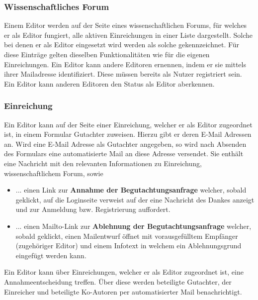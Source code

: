 \subsubsection{Wissenschaftliches Forum}
\begin{description}
     Einem Editor werden auf der Seite eines wissenschaftlichen Forums, für
    welches er als Editor fungiert, alle aktiven Einreichungen in einer Liste dargestellt.
    Solche bei denen er als Editor eingesetzt wird werden als solche gekennzeichnet.
    Für diese Einträge gelten dieselben Funktionalitäten wie für die eigenen Einreichungen. %
     Ein Editor kann andere Editoren ernennen, indem er sie mittels ihrer Mailadresse identifiziert.
    Diese müssen bereits als Nutzer registriert sein.
     Ein Editor kann anderen Editoren den Status als Editor aberkennen.
\end{description}

\subsubsection{Einreichung}
\begin{description}
     Ein Editor kann auf der Seite einer Einreichung, welcher er als Editor zugeordnet ist,
    in einem Formular Gutachter zuweisen. Hierzu gibt er deren E-Mail Adressen an.
     Wird eine E-Mail Adresse als Gutachter angegeben, so wird nach Absenden des Formulars
    eine automatisierte Mail an diese Adresse versendet. Sie enthält eine Nachricht mit den relevanten
    Informationen zu Einreichung, wissenschaftlichem Forum, sowie
    \begin{itemize}
        \item ... einen Link zur \textbf{Annahme der Begutachtungsanfrage} welcher, sobald geklickt,
        auf die Loginseite verweist auf der eine Nachricht des Dankes anzeigt und zur Anmeldung bzw.
        Registrierung auffordert.
        \item ... einen Mailto-Link zur \textbf{Ablehnung der Begutachtungsanfrage} welcher, sobald
        geklickt, einen Mailentwurf öffnet mit vorausgefülltem Empfänger (zugehöriger Editor)
        und einem Infotext in welchem ein Ablehnungsgrund eingefügt werden kann.
    \end{itemize}
     Ein Editor kann über Einreichungen, welcher er als Editor zugeordnet ist,
    eine Annahmeentscheidung treffen. Über diese werden beteiligte Gutachter, der Einreicher und beteiligte Ko-Autoren
    per automatisierter Mail benachrichtigt.
\end{description}

